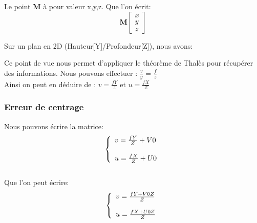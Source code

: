 \documentclass[12pt, french]{report}
\begin{document}
Le point \textbf{M} à pour valeur x,y,z. Que l'on écrit: $$\textbf{M}\begin{bmatrix}x\\y\\z\end{bmatrix}$$

Sur un plan en 2D (Hauteur[Y]/Profondeur[Z]), nous avons:\\

\begin{center}
\end{center}
Ce point de vue nous permet d'appliquer le théorème de Thalès pour récupérer des informations. Nous pouvons effectuer : $\frac{v}{y}$ = $\frac{f}{z}$ \\

Ainsi on peut en déduire de : $v=\frac{fY}{z}$ et $u=\frac{fX}{Z}$

\subsubsection{Erreur de centrage}

Nous pouvons écrire la matrice: 
$$\left\{ 
    \begin{array}{ll}
        v=\frac{fY}{Z}+V0  \\ \\
        u=\frac{fX}{Z}+U0
    \end{array} \\
\right. $$ \\

Que l'on peut écrire: 
$$\left\{ 
    \begin{array}{ll}
        v=\frac{fY+V0Z}{Z} \\ \\
        u=\frac{fX+U0Z}{Z}
    \end{array} \\
\right. $$
\end{document}
